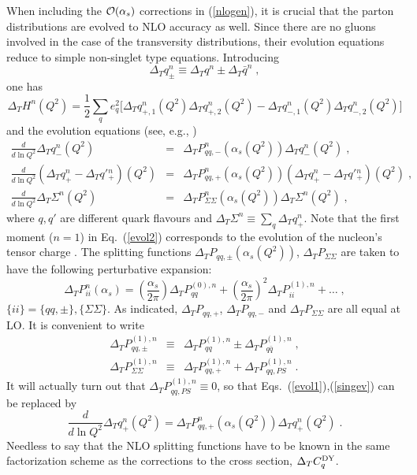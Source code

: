 When including the ${\cal O}(\alpha_s)$ corrections in (\ref{nlogen}),
it is crucial that the parton distributions are evolved to NLO accuracy as 
well. Since there are no gluons involved in the case of the transversity 
distributions, their evolution equations reduce to simple non-singlet type 
equations. Introducing 
\begin{equation}
\Delta_T q_{\pm}^{n} \equiv \Delta_T q^n \pm \Delta_T \bar{q}^n \; ,
\end{equation}
one has
\begin{equation} \label{hdef1}
\Delta_T H^n (Q^2) = \frac{1}{2} \sum_q e_q^2 \Bigg[ \Delta_T q_{+,1}^n (Q^2)
\Delta_T q_{+,2}^n (Q^2) - \Delta_T q_{-,1}^n (Q^2) \Delta_T q_{-,2}^n (Q^2) 
\Bigg]
\end{equation}
and the evolution equations (see, e.g., \cite{ev})
\begin{eqnarray} 
\frac{d}{d\ln Q^2} \Delta_T q_-^n (Q^2) &=& \Delta_T P_{qq,-}^n 
(\alpha_s (Q^2)) \Delta_T q_-^n (Q^2) \label{evol2} \; , \\
\frac{d}{d\ln Q^2} ( \Delta_T q_+^n - \Delta_T q'{}_+^{n} ) (Q^2) &=& 
\Delta_T P_{qq,+}^n (\alpha_s (Q^2)) ( \Delta_T q_+^n - 
\Delta_T q'{}_+^{n} ) (Q^2) \; , \label{evol1} \\
\frac{d}{d\ln Q^2} \Delta_T \Sigma^n (Q^2) &=& \Delta_T P_{\Sigma\Sigma}^n 
(\alpha_s (Q^2)) \Delta_T \Sigma^n (Q^2) \; , \label{singev} 
\end{eqnarray}
where $q,q'$ are different quark flavours and $\Delta_T \Sigma^n \equiv 
\sum_q \Delta_T q_+^n$. Note that the first
moment ($n=1$) in Eq.~(\ref{evol2}) corresponds to the evolution
of the nucleon's tensor charge \cite{jaffe,soffer3}. 
The splitting functions $\Delta_T P_{qq,\pm} (\alpha_s (Q^2))$, 
$\Delta_T P_{\Sigma\Sigma}$ are taken to have the following perturbative 
expansion:
\begin{equation} \label{expan}
\Delta_T P_{ii}^n (\alpha_s) = \left( \frac{\alpha_s}{2\pi} \right) \Delta_T 
P_{qq}^{(0),n} + \left( \frac{\alpha_s}{2\pi} \right)^2 \Delta_T
P_{ii}^{(1),n} + \ldots  \; , 
\end{equation}
$\{ ii \} = \{ qq,\pm \}, \{\Sigma \Sigma \}$. As indicated, 
$\Delta_T P_{qq,+}$, $\Delta_T P_{qq,-}$ and $\Delta_T
P_{\Sigma\Sigma}$ are all equal at LO. It is convenient to write \cite{ev}
\begin{eqnarray} \label{pm}
\Delta_T P_{qq,\pm}^{(1),n} &\equiv& \Delta_T P_{qq}^{(1),n} \pm \Delta_T 
P_{q\bar{q}}^{(1),n} \; , \\
\Delta_T P_{\Sigma\Sigma}^{(1),n} &\equiv& \Delta_T P_{qq,+}^{(1),n} + 
\Delta_T P_{qq,PS}^{(1),n} \; .
\end{eqnarray}
It will actually turn out that $\Delta_T P_{qq,PS}^{(1),n} \equiv 0$, so
that Eqs.~(\ref{evol1}),(\ref{singev}) can be replaced by
\begin{equation} \label{evol3}
\frac{d}{d\ln Q^2} \Delta_T q_+^n (Q^2) = \Delta_T P_{qq,+}^n 
(\alpha_s (Q^2)) \Delta_T q_+^n (Q^2) \; .
\end{equation}
Needless to say that the
NLO splitting functions have to be known in the same factorization scheme
as the corrections to the cross section,  $\Delta_T C_q^{{\small {\rm DY}}}$.

